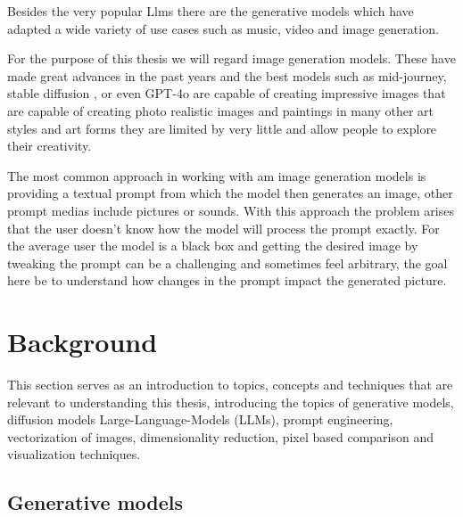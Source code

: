 Besides the very popular Llms there are the generative models which have adapted a wide variety of use cases such as music, video and image generation. 

For the purpose of this thesis we will regard image generation models. These have made great advances in the past years and the best models such as mid-journey\cite{midjourney}, stable diffusion \cite{stable-diffusion}, or even GPT-4o \cite{GPT-4o} are capable of creating impressive images that are capable of creating photo realistic images and paintings in many other art styles and art forms they are limited by very little and allow people to explore their creativity. 

The most common approach in working with am image generation models is providing a textual prompt from which the model then generates an image, other prompt medias include pictures or sounds. With this approach the problem arises that the user doesn't know how the model will process the prompt exactly. For the average user the model is a black box and getting the desired image by tweaking the prompt can be a challenging and sometimes feel arbitrary, the goal here be to understand how changes in the prompt impact the generated picture. 
\chapter{Background}
\label{chap:k2}
This section serves as an introduction to topics, concepts and techniques that are relevant to understanding this thesis, introducing the topics of generative models, diffusion models Large-Language-Models (LLMs), prompt engineering, vectorization of images, dimensionality reduction, pixel based comparison and visualization techniques. 
\section{Generative models}


